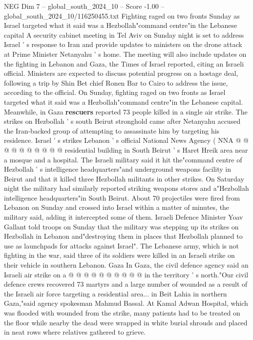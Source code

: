 \begin{textsample}{NEG Dim 7 – global\_south\_2024\_10 – Score -1.00 – global\_south\_2024\_10/116250455.txt}  \label{ex:f7_neg_238}
Fighting raged on two fronts Sunday as Israel targeted what it said was a Hezbollah"command centre"in the Lebanese capital A security cabinet meeting in Tel Aviv on Sunday night is set to address Israel ' s response to Iran and provide updates to ministers on the drone attack at Prime Minister Netanyahu ' s home.
The meeting will also include updates on the fighting in Lebanon and Gaza, the Times of Israel reported, citing an Israeli official.
Ministers are expected to discuss potential progress on a hostage deal, following a trip by Shin Bet chief Ronen Bar to Cairo to address the issue, according to the official.
On Sunday, fighting raged on two fronts as Israel targeted what it said was a Hezbollah"command centre"in the Lebanese capital.
Meanwhile, in Gaza \textbf{rescuers} reported 73 people killed in a single air strike.
The strikes on Hezbollah ' s south Beirut stronghold came after Netanyahu accused the Iran-backed group of attempting to assassinate him by targeting his residence.
Israel ' s strikes Lebanon ' s official National News Agency ( NNA @ @ @ @ @ @ @ @ @ @ residential building in South Beirut ' s Haret Hreik area near a mosque and a hospital.
The Israeli military said it hit the"command centre of Hezbollah ' s intelligence headquarters"and underground weapons facility in Beirut and that it killed three Hezbollah militants in other strikes.
On Saturday night the military had similarly reported striking weapons stores and a"Hezbollah intelligence headquarters"in South Beirut.
About 70 projectiles were fired from Lebanon on Sunday and crossed into Israel within a matter of minutes, the military said, adding it intercepted some of them.
Israeli Defence Minister Yoav Gallant told troops on Sunday that the military was stepping up its strikes on Hezbollah in Lebanon and"destroying them in places that Hezbollah planned to use as launchpads for attacks against Israel".
The Lebanese army, which is not fighting in the war, said three of its soldiers were killed in an Israeli strike on their vehicle in southern Lebanon.
Gaza In Gaza, the civil defence agency said an Israeli air strike on a @ @ @ @ @ @ @ @ @ @ in the territory ' s north."Our civil defence crews recovered 73 martyrs and a large number of wounded as a result of the Israeli air force targeting a residential area... in Beit Lahia in northern Gaza,"said agency spokesman Mahmud Bassal.
At Kamal Adwan Hospital, which was flooded with wounded from the strike, many patients had to be treated on the floor while nearby the dead were wrapped in white burial shrouds and placed in neat rows where relatives gathered to grieve.

\end{textsample}
